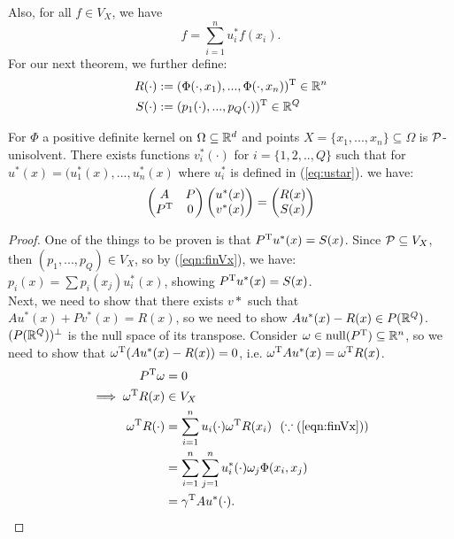 \documentclass[twoside]{memoir}
\begin{document}
	Also, for all $f \in V_X$, we have 
	\begin{equation} \label{eqn:finVx}
	f = \sum_{i=1}^{n} u_i^* f(x_i).
	\end{equation}
	For our next theorem, we further define:
	\begin{equation}
	\begin{split}
	R(\cdot) &:= (\Phi(\cdot, x_1),..., \Phi(\cdot, x_n))^{\text{T}} \in \mathbb{R}^n\\
	S(\cdot) &:= (p_1(\cdot),..., p_Q(\cdot))^{\text{T}} \in \mathbb{R}^Q \\
	\end{split}
	\end{equation}
	\begin{thm}
		For $\Phi$ a positive definite kernel on $\Omega \subseteq \mathbb{R}^d$ and points $X = \{ x_1,..., x_n \} \subseteq \Omega$ is $\mathcal{P}$-unisolvent. There exists functions $v_i^*(\cdot)$ for $i = \{ 1, 2, .., Q \} $ such that for $u^*(x) = (u^*_1(x), ..., u^*_n(x)$ where $u^*_i$ is defined in (\ref{eq:ustar}). we have:
		\begin{equation} \label{eqn:vstar}
		\begin{pmatrix}
		A & P \\
		P^{\text{T}} & 0 \\
		\end{pmatrix}
		\begin{pmatrix}
		u^*(x)\\ v^*(x)
		\end{pmatrix}
		=
		\begin{pmatrix}
		R(x)\\ S(x)
		\end{pmatrix}
		\end{equation}
	\end{thm}
	\begin{proof}
		One of the things to be proven is that $P^{\text{T}} u^*(x) = S(x)$. Since $\mathcal{P} \subseteq V_X$, then $(p_1,..., p_Q) \in V_X$, so by (\ref{eqn:finVx}), we have: $p_i(x) = \sum p_i(x_j)u_i^*(x)$, showing $P^{\text{T}} u^*(x) = S(x)$.\\
		Next, we need to show that there exists $v*$ such that $Au^*(x) + Pv^*(x) = R(x)$, so we need to show $Au^*(x) - R(x) \in P(\mathbb{R}^Q)$.\\
		$(P(\mathbb{R}^Q))^\perp$ is the null space of its transpose. Consider $\omega \in \text{null}(P^{\text{T}}) \subseteq \mathbb{R}^n$, so we need to show that $\omega^{\text{T}} (Au^*(x) - R(x)) = 0$, i.e. $\omega^{\text{T}} Au^*(x) = \omega^{\text{T}} R(x)$.\\
		\begin{equation*}
		\begin{split}
		P^{\text{T}} \omega &= 0\\
		\implies \omega^{\text{T}} R(x) &\in V_X\\
		\omega^{\text{T}} R(\cdot) &= \sum_{i=1}^{n}u_i(\cdot)\omega^{\text{T}} R(x_i) ~~(\because (\ref{eqn:finVx}))\\
		&= \sum_{i=1}^{n} \sum_{j=1}^{n} u_i^*(\cdot) \omega_j \Phi(x_i, x_j) \\
		&= \gamma^{\text{T}} A u^*(\cdot).\\
		\end{split}
		\end{equation*}
	\end{proof}
\end{document}
